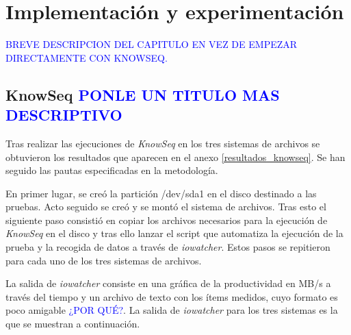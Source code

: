 \cleardoublepage

\chapter[Implementación y experimentación]{Implementación y experimentación}

\textcolor{blue}{BREVE DESCRIPCION DEL CAPITULO EN VEZ DE EMPEZAR DIRECTAMENTE CON KNOWSEQ.}

\section{KnowSeq \textcolor{blue}{PONLE UN TITULO MAS DESCRIPTIVO}}
Tras realizar las ejecuciones de \textit{KnowSeq} en los tres sistemas de archivos se obtuvieron los resultados que aparecen en el anexo \ref{resultados_knowseq}. Se han seguido las pautas especificadas en la metodología. 

En primer lugar, se creó la partición /dev/sda1 en el disco destinado a las pruebas. Acto seguido se creó y se montó el sistema de archivos. Tras esto el siguiente paso consistió en copiar los archivos necesarios para la ejecución de \textit{KnowSeq} en el disco y tras ello lanzar el script que automatiza la ejecución de la prueba y la recogida de datos a través de \textit{iowatcher}. Estos pasos se repitieron para cada uno de los tres sistemas de archivos.

La salida de \textit{iowatcher} consiste en una gráfica de la productividad en MB/s a través del tiempo y un archivo de texto con los ítems medidos, cuyo formato es poco amigable \textcolor{blue}{¿POR QUÉ?}. La salida de \textit{iowatcher} para los tres sistemas es la que se muestran a continuación.\\ 

